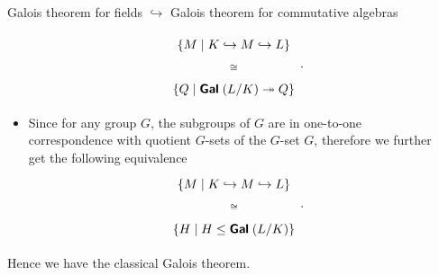 \documentclass[final,20pt]{beamer}
\newcommand{\isomorph}{\cong}
\newcommand{\Gal}[1]{{\fontfamily{lmss}\selectfont 
		\text{\textbf{Gal}} \;#1
}}
\begin{document}
\begin{frame}
\begin{columns}[t]
\begin{column}{.32\linewidth}
\begin{block}{Galois theorem for fields $\hookrightarrow$ Galois theorem for commutative algebras}
\begin{itemize}
{						\[\begin{tikzcd}
							{\{M\;\vert\; K\hookrightarrow M \hookrightarrow L \}} \\
							{\{Q\;\vert\; \Gal{(L/K)} \twoheadrightarrow Q \}}
							\arrow["\isomorph"{description}, draw=none, from=1-1, to=2-1]
						\end{tikzcd}.\]}
					\item {	Since for any group $G$, the subgroups of $G$ are in one-to-one correspondence with quotient $G$-sets of the $G$-set $G$, therefore we further get the following equivalence
						\[\begin{tikzcd}
							{\{M\;\vert\; K\hookrightarrow M \hookrightarrow L \}} \\
							{\{H\;\vert\; H\le \Gal{(L/K)}\}}
							\arrow["\isomorph"{description}, draw=none, from=1-1, to=2-1]
						\end{tikzcd}.\]}
					\end{itemize}
					Hence we have the classical Galois theorem.
			\end{block}
				
			\end{column}
			
			\begin{column}{.32\linewidth}
				

\end{column}
\end{columns}
\end{frame}
\end{document}
